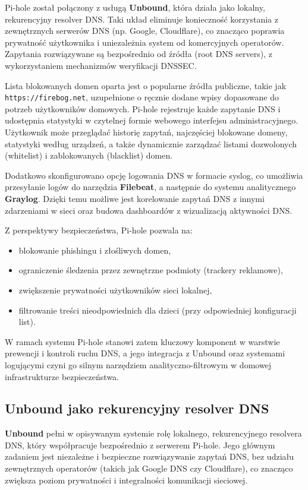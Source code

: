 \documentclass[
    left=2.5cm,         %
    right=2.5cm,        %
    top=2.5cm,          %
    bottom=3cm,         %
    bindingoffset=6mm,  %
    nohyphenation=true %
]{eiti/eiti-thesis} %
\begin{document}
Pi-hole został połączony z usługą \textbf{Unbound}, która działa jako lokalny, rekurencyjny resolver DNS. Taki układ eliminuje konieczność korzystania z zewnętrznych serwerów DNS (np. Google, Cloudflare), co znacząco poprawia prywatność użytkownika i uniezależnia system od komercyjnych operatorów. Zapytania rozwiązywane są bezpośrednio od źródła (root DNS servers), z wykorzystaniem mechanizmów weryfikacji DNSSEC.

Lista blokowanych domen oparta jest o popularne źródła publiczne, takie jak \texttt{https://firebog.net}, uzupełnione o ręcznie dodane wpisy dopasowane do potrzeb użytkowników domowych. Pi-hole rejestruje każde zapytanie DNS i udostępnia statystyki w czytelnej formie webowego interfejsu administracyjnego. Użytkownik może przeglądać historię zapytań, najczęściej blokowane domeny, statystyki według urządzeń, a także dynamicznie zarządzać listami dozwolonych (whitelist) i zablokowanych (blacklist) domen.

Dodatkowo skonfigurowano opcję logowania DNS w formacie syslog, co umożliwia przesyłanie logów do narzędzia \textbf{Filebeat}, a następnie do systemu analitycznego \textbf{Graylog}. Dzięki temu możliwe jest korelowanie zapytań DNS z innymi zdarzeniami w sieci oraz budowa dashboardów z wizualizacją aktywności DNS.

Z perspektywy bezpieczeństwa, Pi-hole pozwala na:
\begin{itemize}
    \item blokowanie phishingu i złośliwych domen,
    \item ograniczenie śledzenia przez zewnętrzne podmioty (trackery reklamowe),
    \item zwiększenie prywatności użytkowników sieci lokalnej,
    \item filtrowanie treści nieodpowiednich dla dzieci (przy odpowiedniej konfiguracji list).
\end{itemize}

W ramach systemu Pi-hole stanowi zatem kluczowy komponent w warstwie prewencji i kontroli ruchu DNS, a jego integracja z Unbound oraz systemami logującymi czyni go silnym narzędziem analityczno-filtrowym w domowej infrastrukturze bezpieczeństwa.

\subsection{Unbound jako rekurencyjny resolver DNS}

\textbf{Unbound}\cite{unbound-docs} pełni w opisywanym systemie rolę lokalnego, rekurencyjnego resolvera DNS, który współpracuje bezpośrednio z serwerem Pi-hole. Jego głównym zadaniem jest niezależne i bezpieczne rozwiązywanie zapytań DNS, bez udziału zewnętrznych operatorów (takich jak Google DNS czy Cloudflare), co znacząco zwiększa poziom prywatności i integralności komunikacji sieciowej.
\end{document}
